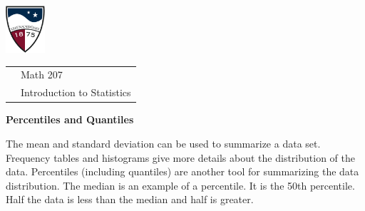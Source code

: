 \documentclass[10pt]{article}
\begin{document}
\pagestyle{empty}
\lstset{language=R, showspaces=false, showstringspaces=false}

\href{http://www.su.edu}{\includegraphics[height=1.75cm]{sulogo.eps}}
\vspace{-1.69cm}

{\small \hfill
\begin{tabular}{cl}
& Math 207\\& Introduction to Statistics\\
\end{tabular}
}
\setlength{\baselineskip}{1.05\baselineskip}
\medskip
\medskip

\begin{center}
\textbf{\large  Percentiles and Quantiles}
\end{center}

The mean and standard deviation can be used to summarize a data set.  
Frequency tables and histograms give more details about the distribution
of the data.  Percentiles (including quantiles) are another tool for 
summarizing the data distribution.
The median is an example of a percentile.  It is the 50th percentile.  Half
the data is less than the median and half is greater.
\newcommand{\HS}{\hspace{20pt}}
\end{document}
